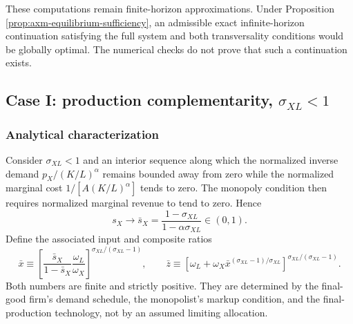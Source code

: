 These computations remain finite-horizon approximations. Under Proposition
\ref{prop:axm-equilibrium-sufficiency}, an admissible exact infinite-horizon
continuation satisfying the full system and both transversality conditions would
be globally optimal. The numerical checks do not prove that such a continuation
exists.

\subsection{\texorpdfstring{Case I: production complementarity, \(\sigma_{XL}<1\)}{Case I: production complementarity, sigma XL < 1}}
\label{sec:axm-case-complements}

\subsubsection{Analytical characterization}

Consider \(\sigma_{XL}<1\) and an interior sequence along which the normalized
inverse demand \(p_X/(K/L)^\alpha\) remains bounded away from zero while the
normalized marginal cost \(1/[A(K/L)^\alpha]\) tends to zero. The monopoly
condition then requires normalized marginal revenue to tend to zero. Hence
\begin{equation}
 s_X\longrightarrow
 \bar s_X=\frac{1-\sigma_{XL}}{1-\alpha\sigma_{XL}}\in(0,1).
 \label{eq:axm-complement-share}
\end{equation}
Define the associated input and composite ratios
\begin{equation}
 \bar x\equiv
 \left[
  \frac{\bar s_X}{1-\bar s_X}\frac{\omega_L}{\omega_X}
 \right]^{\sigma_{XL}/(\sigma_{XL}-1)},
 \qquad
 \bar z\equiv
 \left[\omega_L+\omega_X\bar x^{(\sigma_{XL}-1)/\sigma_{XL}}
 \right]^{\sigma_{XL}/(\sigma_{XL}-1)}.
 \label{eq:axm-complement-ratios}
\end{equation}
Both numbers are finite and strictly positive. They are determined by the
final-good firm's demand schedule, the monopolist's markup condition, and the
final-production technology, not by an assumed limiting allocation.

